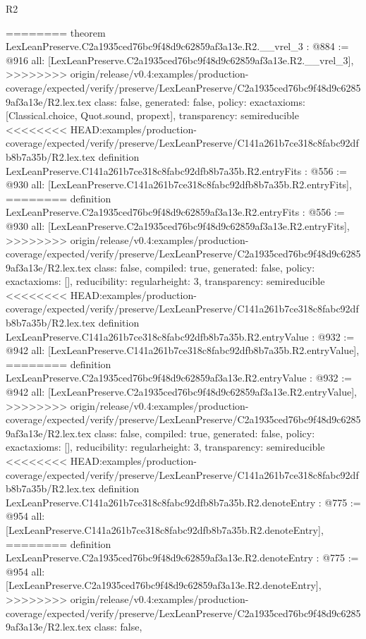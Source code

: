 \begin{lexlean}{R2}
\begin{coremodule}
{{{{{{{{{{{{{{{========
theorem LexLeanPreserve.C2a1935ced76bc9f48d9c62859af3a13e.R2.__vrel_3 : @884 := @916 {
  all: [LexLeanPreserve.C2a1935ced76bc9f48d9c62859af3a13e.R2.__vrel_3],
>>>>>>>> origin/release/v0.4:examples/production-coverage/expected/verify/preserve/LexLeanPreserve/C2a1935ced76bc9f48d9c62859af3a13e/R2.lex.tex
  class: false,
  generated: false,
  policy: exact{axioms: [Classical.choice, Quot.sound, propext]},
  transparency: semireducible
}
<<<<<<<< HEAD:examples/production-coverage/expected/verify/preserve/LexLeanPreserve/C141a261b7ce318c8fabc92dfb8b7a35b/R2.lex.tex
definition LexLeanPreserve.C141a261b7ce318c8fabc92dfb8b7a35b.R2.entryFits : @556 := @930 {
  all: [LexLeanPreserve.C141a261b7ce318c8fabc92dfb8b7a35b.R2.entryFits],
========
definition LexLeanPreserve.C2a1935ced76bc9f48d9c62859af3a13e.R2.entryFits : @556 := @930 {
  all: [LexLeanPreserve.C2a1935ced76bc9f48d9c62859af3a13e.R2.entryFits],
>>>>>>>> origin/release/v0.4:examples/production-coverage/expected/verify/preserve/LexLeanPreserve/C2a1935ced76bc9f48d9c62859af3a13e/R2.lex.tex
  class: false,
  compiled: true,
  generated: false,
  policy: exact{axioms: []},
  reducibility: regular{height: 3},
  transparency: semireducible
}
<<<<<<<< HEAD:examples/production-coverage/expected/verify/preserve/LexLeanPreserve/C141a261b7ce318c8fabc92dfb8b7a35b/R2.lex.tex
definition LexLeanPreserve.C141a261b7ce318c8fabc92dfb8b7a35b.R2.entryValue : @932 := @942 {
  all: [LexLeanPreserve.C141a261b7ce318c8fabc92dfb8b7a35b.R2.entryValue],
========
definition LexLeanPreserve.C2a1935ced76bc9f48d9c62859af3a13e.R2.entryValue : @932 := @942 {
  all: [LexLeanPreserve.C2a1935ced76bc9f48d9c62859af3a13e.R2.entryValue],
>>>>>>>> origin/release/v0.4:examples/production-coverage/expected/verify/preserve/LexLeanPreserve/C2a1935ced76bc9f48d9c62859af3a13e/R2.lex.tex
  class: false,
  compiled: true,
  generated: false,
  policy: exact{axioms: []},
  reducibility: regular{height: 3},
  transparency: semireducible
}
<<<<<<<< HEAD:examples/production-coverage/expected/verify/preserve/LexLeanPreserve/C141a261b7ce318c8fabc92dfb8b7a35b/R2.lex.tex
definition LexLeanPreserve.C141a261b7ce318c8fabc92dfb8b7a35b.R2.denoteEntry : @775 := @954 {
  all: [LexLeanPreserve.C141a261b7ce318c8fabc92dfb8b7a35b.R2.denoteEntry],
========
definition LexLeanPreserve.C2a1935ced76bc9f48d9c62859af3a13e.R2.denoteEntry : @775 := @954 {
  all: [LexLeanPreserve.C2a1935ced76bc9f48d9c62859af3a13e.R2.denoteEntry],
>>>>>>>> origin/release/v0.4:examples/production-coverage/expected/verify/preserve/LexLeanPreserve/C2a1935ced76bc9f48d9c62859af3a13e/R2.lex.tex
  class: false,
}}}}}}}}}}}}}}}}}}}
\end{coremodule}
\end{lexlean}
